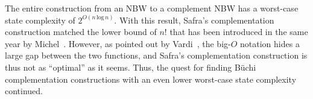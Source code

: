 The entire construction from an NBW to a complement NBW has a worst-case state complexity of $2^{O\left(n\, \text{log}\, n\right)}$. With this result, Safra's complementation construction matched the lower bound of $n!$ that has been introduced in the same year by Michel~\cite{michel1988}. However, as pointed out by Vardi~\cite{2007_vardi}, the big-$O$ notation hides a large gap between the two functions, and Safra's complementation construction is thus not as ``optimal'' as it seems. Thus, the quest for finding Büchi complementation constructions with an even lower worst-case state complexity continued.




